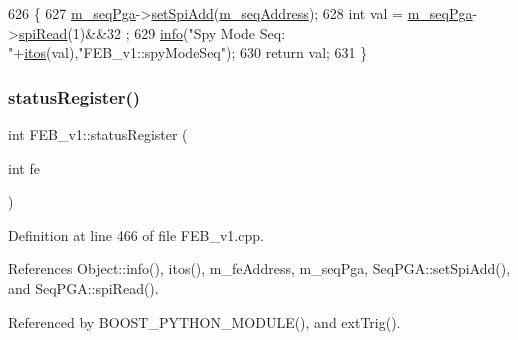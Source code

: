 \begin{DoxyCode}
626                         \{
627   \hyperlink{classFEB__v1_a6c7804ac86796f233a8393043adf2e77}{m\_seqPga}->\hyperlink{classSeqPGA_ac998ce3a6d9b5f2e88cc8393f8c1df53}{setSpiAdd}(\hyperlink{classFEB__v1_a1c1eb093fd1733b9510fcf8bc5c7ad08}{m\_seqAddress});
628   \textcolor{keywordtype}{int} val = \hyperlink{classFEB__v1_a6c7804ac86796f233a8393043adf2e77}{m\_seqPga}->\hyperlink{classSeqPGA_ab3d0e5e5d4014bc7a92588a76b8713d4}{spiRead}(1)&&32 ;
629   \hyperlink{classObject_a644fd329ea4cb85f54fa6846484b84a8}{info}(\textcolor{stringliteral}{"Spy Mode Seq: "}+\hyperlink{Tools_8h_af330027dbdafb9a30768b3613c553e60}{itos}(val),\textcolor{stringliteral}{"FEB\_v1::spyModeSeq"});
630   \textcolor{keywordflow}{return} val;
631 \}
\end{DoxyCode}
\mbox{\label{classFEB__v1_aa98b8e0bcc4d6d03f4b365de786f5c95}} 
\subsubsection{\texorpdfstring{status\+Register()}{statusRegister()}}
{\footnotesize\ttfamily int F\+E\+B\+\_\+v1\+::status\+Register (\begin{DoxyParamCaption}\item[{int}]{fe }\end{DoxyParamCaption})}



Definition at line 466 of file F\+E\+B\+\_\+v1.\+cpp.



References Object\+::info(), itos(), m\+\_\+fe\+Address, m\+\_\+seq\+Pga, Seq\+P\+G\+A\+::set\+Spi\+Add(), and Seq\+P\+G\+A\+::spi\+Read().



Referenced by B\+O\+O\+S\+T\+\_\+\+P\+Y\+T\+H\+O\+N\+\_\+\+M\+O\+D\+U\+L\+E(), and ext\+Trig().


